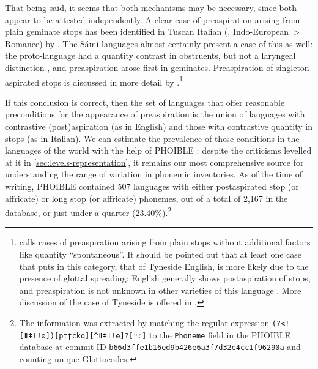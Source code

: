 \documentclass[output=paper,colorlinks,citecolor=brown]{langscibook}
\begin{document}
That being said, it seems that both mechanisms may be necessary, since both appear to be attested independently. A clear case of preaspiration arising from plain geminate stops has been identified in Tuscan Italian (, Indo\hyp European~> Romance) by \textcite{gobl1999voice, stevens2007towards, stevens2011, stevens2014pre, coretta2020vowel}. The Sámi languages almost certainly present a case of this as well: the proto\hyp language had a quantity contrast in obstruents, but not a laryngeal distinction \parencite{aikio2022proto}, and preaspiration arose first in geminates. Preaspiration of singleton aspirated stops is discussed in more detail by .\footnote{\Textcite{Clayton2010} calls cases of preaspiration arising from plain {\VOICELESS} stops without additional factors like quantity \enquote{spontaneous}. It should be pointed out that at least one case that \textcite[49]{Clayton2010} puts in this category, that of Tyneside English, is more likely due to the presence of glottal spreading: English generally shows postaspiration of {\VOICELESS} stops, and preaspiration is not unknown in other varieties of this language \parencite[e.\,g.][]{jones2008, hejná2015pre, Hejná2021}. More discussion of the case of Tyneside is offered in \textcite{iosad2020phonological}.}

If this conclusion is correct, then the set of languages that offer reasonable preconditions for the appearance of preaspiration is the union of languages with contrastive (post)aspiration (as in English) and those with contrastive quantity in stops (as in Italian). We can estimate the prevalence of these conditions in the languages of the world with the help of PHOIBLE \parencite{phoible}: despite the criticisms levelled at it in \cref{sec:levels-representation}, it remains our most comprehensive source for understanding the range of variation in phonemic inventories. As of the time of writing, PHOIBLE contained 507 languages with either postaspirated stop (or affricate) or long stop (or affricate) phonemes, out of a total of 2,167 in the database, or just under a quarter (23.40\%).\footnote{The information was extracted by matching the regular expression \texttt{(?<![ǁǂǀǃʘ])[ptʈckq][\textasciicircum{}ǁǂǀǃʘ]?[ʰː]} to the \texttt{Phoneme} field in the PHOIBLE database at commit ID \texttt{b66d3ffe1b16ed9b426e6a3f7d32e4cc1f96290a} and counting unique Glottocodes.}
\end{document}
